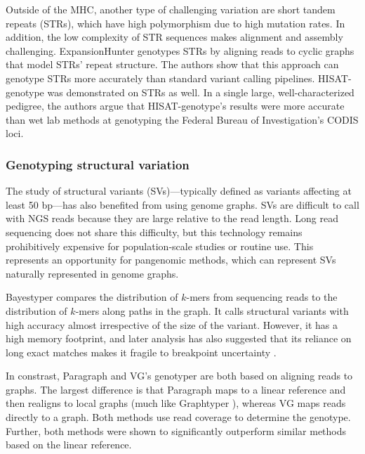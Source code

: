Outside of the MHC, another type of challenging variation are short tandem repeats (STRs), which have high polymorphism due to high mutation rates.
In addition, the low complexity of STR sequences makes alignment and assembly challenging.
ExpansionHunter \cite{dolzhenko2019expansionhunter} genotypes STRs by aligning reads to cyclic graphs that model STRs' repeat structure.
The authors show that this approach can genotype STRs more accurately than standard variant calling pipelines.
HISAT-genotype \cite{Kim_2019} was demonstrated on STRs as well. 
In a single large, well-characterized pedigree, the authors argue that HISAT-genotype's results were more accurate than wet lab methods at genotyping the Federal Bureau of Investigation's CODIS loci.

\subsubsection{Genotyping structural variation}

The study of structural variants (SVs)---typically defined as variants affecting at least 50 bp---has also benefited from using genome graphs.
SVs are difficult to call with NGS reads because they are large relative to the read length.
Long read sequencing does not share this difficulty, but this technology remains prohibitively expensive for population-scale studies or routine use.
This represents an opportunity for pangenomic methods, which can represent SVs naturally represented in genome graphs.

Bayestyper \cite{sibbesen2018accurate} compares the distribution of $k$-mers from sequencing reads to the distribution of $k$-mers along paths in the graph.
It calls structural variants with high accuracy almost irrespective of the size of the variant.
However, it has a high memory footprint, and later analysis has also suggested that its reliance on long exact matches makes it fragile to breakpoint uncertainty \cite{hickey2019genotyping}.

In constrast, Paragraph \cite{chen2019paragraph} and VG's genotyper \cite{hickey2019genotyping} are both based on aligning reads to graphs.
The largest difference is that Paragraph maps to a linear reference and then realigns to local graphs (much like Graphtyper \cite{eggertsson2017graphtyper}), whereas VG maps reads directly to a graph.
Both methods use read coverage to determine the genotype.
Further, both methods were shown to significantly outperform similar methods based on the linear reference.

